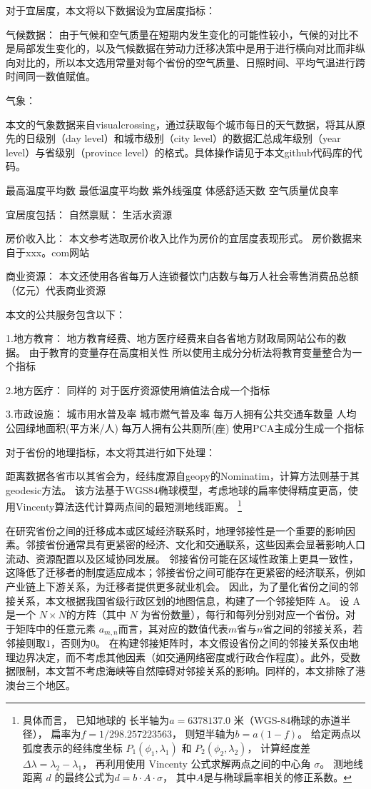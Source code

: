 \documentclass[a4paper, zihao=-4, fontset = mac, oneside]{ctexbook} %
\let\oldfootnote\footnote
\renewcommand{\footnote}[1]{%
  \oldfootnote{\setstretch{1.5}#1}%
}
\begin{document}
对于宜居度，本文将以下数据设为宜居度指标：

气候数据：
由于气候和空气质量在短期内发生变化的可能性较小，气候的对比不是局部发生变化的，以及气候数据在劳动力迁移决策中是用于进行横向对比而非纵向对比的，所以本文选用常量对每个省份的空气质量、日照时间、平均气温进行跨时间同一数值赋值。

气象：

本文的气象数据来自visualcrossing，通过获取每个城市每日的天气数据，将其从原先的日级别（day level）和城市级别（city level）的数据汇总成年级别（year level）与省级别（province level）的格式。具体操作请见于本文github代码库的代码。

最高温度平均数 最低温度平均数 紫外线强度 体感舒适天数  空气质量优良率


宜居度包括：
自然禀赋：
生活水资源


房价收入比：
本文参考\textcite{LiHuiFangJieFangJieShouRuBiYuLiuDongRenKouChangQiJuLiuYiYuanLaiZiLiuDongRenKouDeWeiGuanZhengJu2019}选取房价收入比作为房价的宜居度表现形式。
房价数据来自于xxx。com网站

商业资源：
本文还使用各省每万人连锁餐饮门店数与每万人社会零售消费品总额（亿元）代表商业资源


本文的公共服务包含以下：

1.地方教育：
地方教育经费、地方医疗经费来自各省地方财政局网站公布的数据。
由于教育的变量存在高度相关性
所以使用主成分分析法将教育变量整合为一个指标

2.地方医疗：
同样的
对于医疗资源使用熵值法合成一个指标

3.市政设施：
城市用水普及率
城市燃气普及率
每万人拥有公共交通车数量
人均公园绿地面积(平方米/人)
每万人拥有公共厕所(座)
使用PCA主成分生成一个指标


对于省份的地理指标，本文将其进行如下处理：

距离数据各省市以其省会为，经纬度源自geopy的Nominatim，计算方法则基于其geodesic方法。
该方法基于WGS84椭球模型，考虑地球的扁率使得精度更高，使用Vincenty算法迭代计算两点间的最短测地线距离。
\footnote{
具体而言，
已知地球的
长半轴为$a = 6378137.0$ 米（WGS-84椭球的赤道半径），
扁率为$f = 1 / 298.257223563$，
则短半轴为$b = a(1 - f)$。
给定两点以弧度表示的经纬度坐标 $ P_1(\phi_1, \lambda_1) $ 和 $ P_2(\phi_2, \lambda_2) $，
计算经度差$\Delta\lambda = \lambda_2 - \lambda_1$，
再利用使用 Vincenty 公式求解两点之间的中心角 $\sigma$。
测地线距离 $d$ 的最终公式为$d = b \cdot A \cdot \sigma$，
其中$A$是与椭球扁率相关的修正系数。
}

在研究省份之间的迁移成本或区域经济联系时，地理邻接性是一个重要的影响因素。邻接省份通常具有更紧密的经济、文化和交通联系，这些因素会显著影响人口流动、资源配置以及区域协同发展。
邻接省份可能在区域性政策上更具一致性，这降低了迁移者的制度适应成本；邻接省份之间可能存在更紧密的经济联系，例如产业链上下游关系，为迁移者提供更多就业机会。
因此，为了量化省份之间的邻接关系，本文根据我国省级行政区划的地图信息，构建了一个邻接矩阵 A。
设 A 是一个 $N \times N$的方阵（其中 $N$ 为省份数量），每行和每列分别对应一个省份。对于矩阵中的任意元素 $a_{m,n}$而言，其对应的数值代表$m$省与$n$省之间的邻接关系，若邻接则取$1$，否则为$0$。
在构建邻接矩阵时，本文假设省份之间的邻接关系仅由地理边界决定，而不考虑其他因素（如交通网络密度或行政合作程度）。此外，受数据限制，本文暂不考虑海峡等自然障碍对邻接关系的影响。同样的，本文排除了港澳台三个地区。
\end{document}

